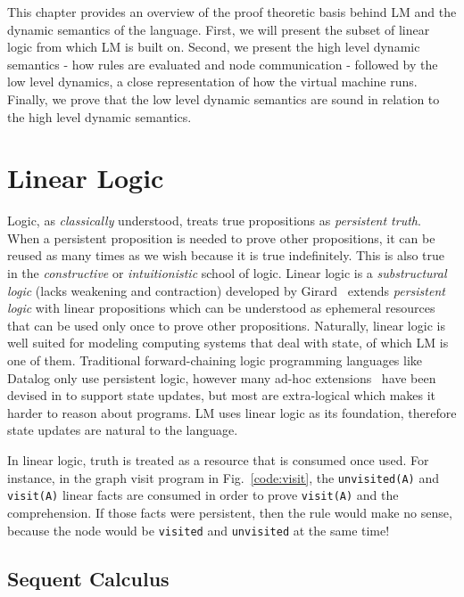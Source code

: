 This chapter provides an overview of the proof theoretic basis behind LM
and the dynamic semantics of the language. First, we will present the subset of
linear logic from which LM is built on. Second, we present the high level
dynamic semantics - how rules are evaluated and node communication - followed by
the low level dynamics, a close representation of how the virtual machine runs.
Finally, we prove that the low level dynamic semantics are sound in relation to
the high level dynamic semantics.

\section{Linear Logic}

Logic, as \emph{classically} understood, treats true propositions as
\emph{persistent truth}. When a persistent proposition is needed to prove other
propositions, it can be reused as many times as we wish because it is true
indefinitely. This is also true in the \emph{constructive} or
\emph{intuitionistic} school of logic.  Linear logic is a \emph{substructural
logic} (lacks weakening and contraction) developed by
Girard~\cite{Girard95logic:its} extends \emph{persistent logic} with linear
propositions which can be understood as ephemeral resources that can be used
only once to prove other propositions.  Naturally, linear logic is well
suited for modeling computing systems that deal with state, of which LM is
one of them.  Traditional forward-chaining logic programming languages like
Datalog only use persistent logic, however many ad-hoc
extensions~\cite{Liu98extendingdatalog,Ludascher95alogical} have been devised
in to support state updates, but most are extra-logical which makes it harder
to reason about programs. LM uses linear logic as its foundation, therefore
state updates are natural to the language.

In linear logic, truth is treated as a resource that is consumed once used. For
instance, in the graph visit program in Fig.~\ref{code:visit}, the
\texttt{unvisited(A)} and \texttt{visit(A)} linear facts are consumed in order
to prove \texttt{visit(A)} and the comprehension. If those facts were
persistent, then the rule would make no sense, because the node would be
\texttt{visited} and \texttt{unvisited} at the same time!

\subsection{Sequent Calculus}

